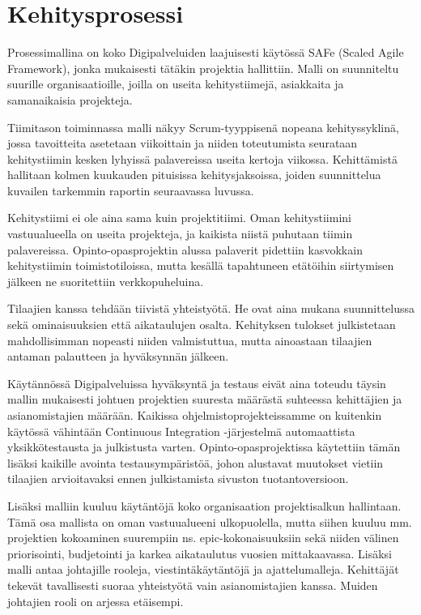 \documentclass[11pt]{article}
\begin{document}
\section{Kehitysprosessi}

Prosessimallina on koko Digipalveluiden laajuisesti käytössä SAFe (Scaled Agile
Framework), jonka mu\-kai\-ses\-ti tätäkin projektia hallittiin. Malli on
suunniteltu suurille organisaatioille, joilla on useita kehitystiimejä,
asiakkaita ja samanaikaisia projekteja.

Tiimitason toiminnassa malli näkyy Scrum-tyyppisenä nopeana kehityssyklinä,
jossa tavoitteita ase\-tetaan viikoittain ja niiden toteutumista seurataan
kehitystiimin kesken lyhyissä palavereissa useita kertoja viikossa.
Kehittämistä hallitaan kolmen kuukauden pituisissa kehi\-tysjaksoissa, joiden
suunnittelua kuvailen tarkemmin raportin seuraavassa luvussa.

Kehitystiimi ei ole aina sama kuin projektitiimi. Oman kehitystiimini
vastuualueella on useita projekteja, ja kaikista niistä puhutaan tiimin
palave\-reis\-sa. Opinto-opasprojektin alus\-sa palaverit pidettiin kasvokkain kehitystiimin
toimisto\-tiloissa, mutta kesällä tapahtuneen etä\-töihin siirtymisen jälkeen ne
suoritettiin verkko\-puheluina.

Tilaajien kanssa tehdään tiivistä yhteis\-työtä. He ovat aina mukana
suunnittelussa sekä ominaisuuksien että aika\-tau\-lujen osalta.
Kehityksen tulokset julkistetaan mahdollisimman nopeasti niiden valmistuttua,
mutta ainoastaan tilaajien antaman palautteen ja hyväksynnän jälkeen.

Käytännössä Digipalveluissa hyväksyntä ja testaus eivät aina toteudu täysin
mallin mukai\-sesti johtuen projektien suuresta määrästä suhteessa kehittäjien ja
asianomistajien mää\-rään. Kaikissa ohjel\-mistoprojekteissamme on kuitenkin käytössä
vähintään Continuous Integration -järjestelmä automaattista yksikkö\-testausta
ja julkistusta varten. Opinto-opas\-pro\-jek\-tissa käytettiin tämän lisäksi kaikille
avointa testausympäristöä, johon alustavat muutokset vie\-tiin tilaajien
arvioitavaksi ennen julkistamista sivuston tuotantoversioon.

Lisäksi malliin kuuluu käytäntöjä koko organisaation projektisalkun hallintaan.
Tämä osa mallista on oman vastuualueeni ulkopuolella, mutta siihen kuuluu mm.
projektien kokoaminen suurempiin ns. epic-kokonaisuuksiin sekä niiden välinen
priorisointi, budjetointi ja karkea aikataulutus vuosien mittakaavassa. Lisäksi
malli antaa johtajille rooleja, vies\-tintä\-käy\-täntöjä ja ajattelumalleja.
Kehittäjät tekevät tavallisesti suoraa yhteistyötä vain asian\-omistajien kanssa.
Muiden johtajien rooli on arjessa etäisempi.
\end{document}
